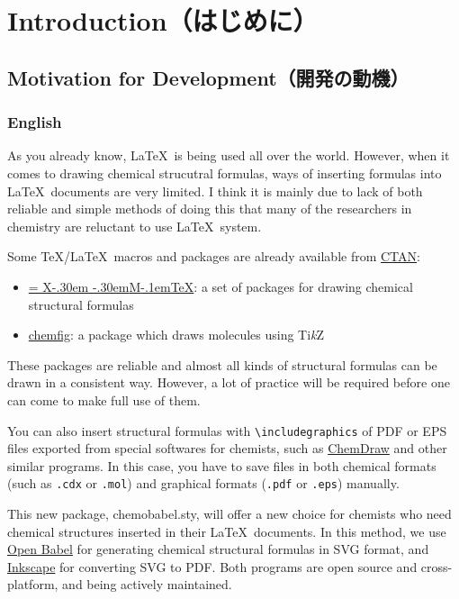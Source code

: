 \documentclass[12pt]{ltjsarticle}
\def\XyM{\ifnum\fam=-1\relax\fam=0\relax\fi\TestCount=\fam%
X\kern-.30em\smash{\raise.50ex\hbox{$\fam\TestCount\Upsilon$}}%
\kern-.30em{M}}
\def\XyMTeX{\XyM\kern-.1em\TeX}
\begin{document}
\clearpage
\setcounter{tocdepth}{3}
\tableofcontents

\clearpage
{}

\section{Introduction（はじめに）}

\subsection{Motivation for Development（開発の動機）}

\subsubsection{English}

As you already know, \LaTeX\ is being used all over the world.
However, when it comes to drawing chemical strucutral formulas,
ways of inserting formulas into \LaTeX\ documents are very limited.
I think it is mainly due to lack of both reliable and simple methods
of doing this that many of the researchers in chemistry are reluctant
to use \LaTeX\ system.

Some \TeX/\LaTeX\ macros and packages are already available from
\href{http://www.ctan.org/}{CTAN}:
\begin{itemize}
  \item \href{http://www.ctan.org/pkg/xymtex}{\XyMTeX}:
    a set of packages for drawing chemical structural formulas
\item \href{http://www.ctan.org/pkg/chemfig}{\textsf{chemfig}}:
    a package which draws molecules using Ti\textit{k}Z
\end{itemize}
These packages are reliable and almost all kinds of structural formulas
can be drawn in a consistent way. However, a lot of practice will be
required before one can come to make full use of them.

You can also insert structural formulas with \verb|\includegraphics| of
PDF or EPS files exported from special softwares for chemists, such as
\href{http://www.cambridgesoft.com/Ensemble_for_Chemistry/ChemDraw/}{ChemDraw}
and other similar programs.
In this case, you have to save files in both chemical formats
(such as \verb|.cdx| or \verb|.mol|) and graphical formats
(\verb|.pdf| or \verb|.eps|) manually.

This new package, \textsf{chemobabel.sty}, will offer a new choice for
chemists who need chemical structures inserted in their \LaTeX\ documents.
In this method, we use \href{http://openbabel.org/}{Open Babel} for
generating chemical structural formulas in SVG format,
and \href{https://inkscape.org/en/}{Inkscape} for converting SVG to PDF.
Both programs are open source and cross-platform, and being actively maintained. \\
\end{document}
